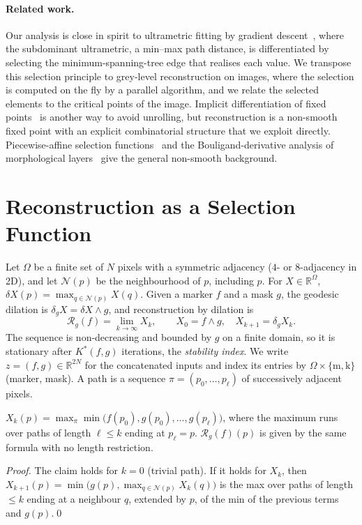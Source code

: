 \documentclass[runningheads]{llncs}
\newcommand{\R}{\mathbb{R}}
\newcommand{\Rec}{\mathcal{R}}
\newcommand{\dom}{\Omega}
\begin{document}
\paragraph{Related work.} Our analysis is close in spirit to ultrametric fitting by gradient descent~\cite{chierchia2019}, where the subdominant ultrametric, a min--max path distance, is differentiated by selecting the minimum-spanning-tree edge that realises each value. We transpose this selection principle to grey-level reconstruction on images, where the selection is computed on the fly by a parallel algorithm, and we relate the selected elements to the critical points of the image. Implicit differentiation of fixed points~\cite{bai2019} is another way to avoid unrolling, but reconstruction is a non-smooth fixed point with an explicit combinatorial structure that we exploit directly. Piecewise-affine selection functions~\cite{scholtes2012} and the Bouligand-derivative analysis of morphological layers~\cite{blusseau2024} give the general non-smooth background.

\section{Reconstruction as a Selection Function}\label{sec:theory}
Let $\dom$ be a finite set of $N$ pixels with a symmetric adjacency ($4$- or $8$-adjacency in 2D), and let $\mathcal N(p)$ be the neighbourhood of $p$, including $p$. For $X\in\R^\dom$, $\delta X(p)=\max_{q\in\mathcal N(p)}X(q)$. Given a marker $f$ and a mask $g$, the geodesic dilation is $\delta_g X=\delta X\wedge g$, and reconstruction by dilation is
\begin{equation}
\Rec_g(f)=\lim_{k\to\infty}X_k,\qquad X_0=f\wedge g,\quad X_{k+1}=\delta_g X_k .
\end{equation}
The sequence is non-decreasing and bounded by $g$ on a finite domain, so it is stationary after $K^\ast(f,g)$ iterations, the \emph{stability index}. We write $z=(f,g)\in\R^{2N}$ for the concatenated inputs and index its entries by $\dom\times\{\mathrm m,\mathrm k\}$ (marker, mask). A path is a sequence $\pi=(p_0,\dots,p_\ell)$ of successively adjacent pixels.

\begin{proposition}\label{prop:path}
$X_k(p)=\max_{\pi}\min\big(f(p_0),g(p_0),\dots,g(p_\ell)\big)$, where the maximum runs over paths of length $\ell\le k$ ending at $p_\ell=p$. $\Rec_g(f)(p)$ is given by the same formula with no length restriction.
\end{proposition}
\begin{proof}
The claim holds for $k=0$ (trivial path). If it holds for $X_k$, then $X_{k+1}(p)=\min\big(g(p),\max_{q\in\mathcal N(p)}X_k(q)\big)$ is the max over paths of length $\le k$ ending at a neighbour $q$, extended by $p$, of the min of the previous terms and $g(p)$.\qed
\end{proof}
\end{document}
